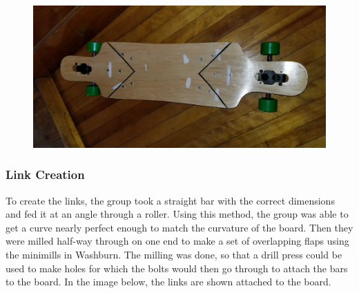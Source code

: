 \documentclass[letterpaper,12pt]{article}
\begin{document}
\begin{figure}[!htbp]\centering
\begin{minipage}{.5\textwidth}\centering
\includegraphics[width=\textwidth]{figs/board-top.jpg}
\label{board-top}
\end{minipage}
\end{figure}

\subsubsection{Link Creation}
To create the links, the group took a straight bar with the correct dimensions and fed it at an angle through a roller. Using this method, the group was able to get a curve nearly perfect enough to match the curvature of the board. Then they were milled half-way through on one end to make a set of overlapping flaps using the minimills in Washburn. The milling was done, so that a drill press could be used to make holes for which the bolts would then go through to attach the bars to the board. In the image below, the links are shown attached to the board.
\end{document}
